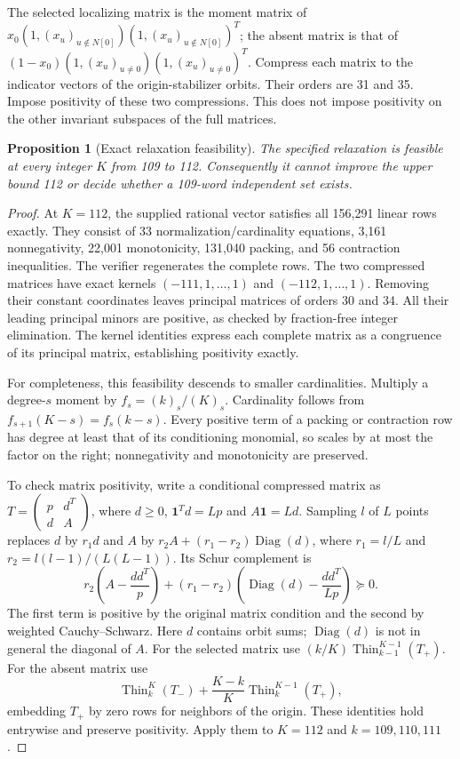 \documentclass[11pt]{article}
\newtheorem{proposition}[theorem]{Proposition}
\theoremstyle{definition}
\newcommand{\one}{\mathbf 1}
\begin{document}
The selected localizing matrix is the moment matrix of
$x_0(1,(x_u)_{u\notin N[0]})(1,(x_u)_{u\notin N[0]})^T$;
the absent matrix is that of
$(1-x_0)(1,(x_u)_{u\ne0})(1,(x_u)_{u\ne0})^T$.
Compress each matrix to the indicator vectors of the origin-stabilizer
orbits. Their orders are 31 and 35. Impose positivity of these two
compressions. This does not impose positivity on the other invariant
subspaces of the full matrices.

\begin{proposition}[Exact relaxation feasibility]\label{prop:barrier}
The specified relaxation is feasible at every integer $K$ from 109 to 112.
Consequently it cannot improve the upper bound 112 or decide whether
a 109-word independent set exists.
\end{proposition}
\begin{proof}
At $K=112$, the supplied rational vector satisfies all 156,291 linear
rows exactly. They consist of 33 normalization/cardinality equations,
3,161 nonnegativity, 22,001 monotonicity, 131,040 packing, and 56
contraction inequalities. The verifier regenerates the complete rows.
The two compressed matrices have exact kernels $(-111,1,\ldots,1)$ and
$(-112,1,\ldots,1)$. Removing their constant coordinates leaves
principal matrices of orders 30 and 34. All their leading principal
minors are positive, as checked by fraction-free integer elimination.
The kernel identities express each complete matrix as a congruence of
its principal matrix, establishing positivity exactly.

For completeness, this feasibility descends to smaller cardinalities.
Multiply a degree-$s$ moment by $f_s=(k)_s/(K)_s$. Cardinality follows
from $f_{s+1}(K-s)=f_s(k-s)$. Every positive term of a packing or
contraction row has degree at least that of its conditioning monomial,
so scales by at most the factor on the right; nonnegativity and
monotonicity are preserved.

To check matrix positivity, write a conditional compressed matrix as
$T=\left(\begin{smallmatrix}p&d^T\\d&A\end{smallmatrix}\right)$,
where $d\geq0$, $\one^Td=Lp$ and $A\one=Ld$.
Sampling $l$ of $L$ points replaces $d$ by $r_1d$ and $A$ by
$r_2A+(r_1-r_2)\operatorname{Diag}(d)$, where
$r_1=l/L$ and $r_2=l(l-1)/(L(L-1))$.
Its Schur complement is
\[
 r_2\left(A-\frac{dd^T}{p}\right)
 +(r_1-r_2)\left(\operatorname{Diag}(d)-\frac{dd^T}{Lp}\right)\succeq0.
\]
The first term is positive by the original matrix condition and the
second by weighted Cauchy--Schwarz. Here $d$ contains orbit sums;
$\operatorname{Diag}(d)$ is not in general the diagonal of $A$.
For the selected matrix use $(k/K)\operatorname{Thin}_{k-1}^{K-1}(T_+)$.
For the absent matrix use
\[
 \operatorname{Thin}_{k}^{K}(T_-)
 +\frac{K-k}{K}\operatorname{Thin}_{k}^{K-1}(T_+),
\]
embedding $T_+$ by zero rows for neighbors of the origin.
These identities hold entrywise and preserve positivity. Apply them
to $K=112$ and $k=109,110,111$.
\end{proof}
\end{document}
